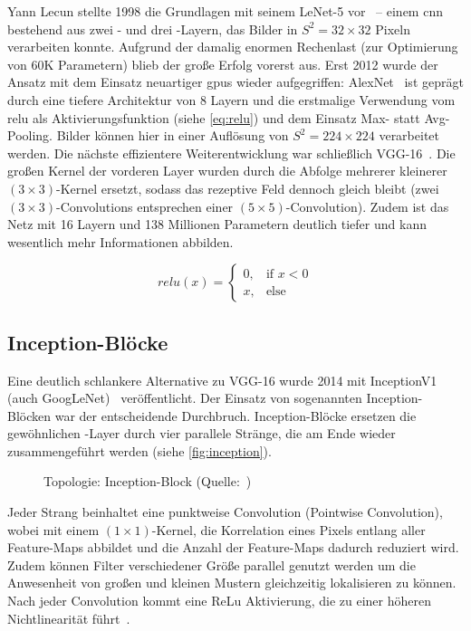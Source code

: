 Yann Lecun stellte 1998 die Grundlagen mit seinem LeNet-5 vor~\cite{Lecun98} -- einem \gls{cnn} bestehend aus zwei \conv- und drei \fc-Layern, das Bilder in $S^2=32 \times 32$ Pixeln verarbeiten konnte.
Aufgrund der damalig enormen Rechenlast (zur Optimierung von 60K Parametern) blieb der große Erfolg vorerst aus.
Erst 2012 wurde der Ansatz mit dem Einsatz neuartiger \glspl{gpu} wieder aufgegriffen:
AlexNet~\cite{Krizhevsky12} ist geprägt durch eine tiefere Architektur von 8 Layern und die erstmalige Verwendung vom \gls{relu} als Aktivierungsfunktion (siehe \autoref{eq:relu}) und dem Einsatz Max- statt Avg-Pooling.
Bilder können hier in einer Auflösung von $S^2=224 \times 224$ verarbeitet werden.
Die nächste effizientere Weiterentwicklung war schließlich VGG-16~\cite{Simonyan15}.
Die großen Kernel der vorderen Layer wurden durch die Abfolge mehrerer kleinerer $(3 \times 3)$-Kernel ersetzt, sodass das rezeptive Feld dennoch gleich bleibt (zwei $(3 \times 3)$-Convolutions entsprechen einer $(5 \times 5)$-Convolution).
Zudem ist das Netz mit 16 Layern und 138 Millionen Parametern deutlich tiefer und kann wesentlich mehr Informationen abbilden.

\begin{equation}
    \label{eq:relu}
    relu(x) = \begin{cases}
                    0, & \text{if } x < 0\\
                    x, & \text{else}
    \end{cases}
\end{equation}

\subsection{Inception-Blöcke}
\label{subsec:inception-bloecke}

Eine deutlich schlankere Alternative zu VGG-16 wurde 2014 mit InceptionV1 (auch GoogLeNet)~\cite{Szegedy14} veröffentlicht.
Der Einsatz von sogenannten Inception-Blöcken war der entscheidende Durchbruch.
Inception-Blöcke ersetzen die gewöhnlichen \conv-Layer durch vier parallele Stränge, die am Ende wieder zusammengeführt werden (siehe \autoref{fig:inception}).

\begin{figure}[hb!]
    \centering
    \caption{Topologie: Inception-Block (Quelle:~\cite{Karim19})}
    \label{fig:inception}
\end{figure}

Jeder Strang beinhaltet eine punktweise Convolution (Pointwise Convolution), wobei mit einem $(1 \times 1)$-Kernel, die Korrelation eines Pixels entlang aller Feature-Maps abbildet und die Anzahl der Feature-Maps dadurch reduziert wird.
Zudem können Filter verschiedener Größe parallel genutzt werden um die Anwesenheit von großen und kleinen Mustern gleichzeitig lokalisieren zu können.
Nach jeder Convolution kommt eine ReLu Aktivierung, die zu einer höheren Nichtlinearität führt~\cite{Pointer19}.

